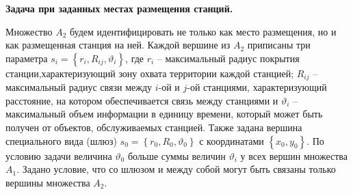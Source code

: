 


\textbf{Задача при заданных местах размещения станций.}






Множество $A_2$ будем идентифицировать не только как место размещения, но и как размещенная станция на ней. Каждой вершине из $A_2$ приписаны три параметра $s_i = \left\{ r_i, R_{ij},\vartheta_i \right\}$, где $r_i$ -- максимальный радиус покрытия станции,характеризующий зону охвата территории каждой станцией; $R_{ij}$ -- максимальный радиус связи между $i$-ой и $j$-ой станциями, характеризующий расстояние, на котором обеспечивается связь между станциями и $\vartheta_i$ -- максимальный объем информации в единицу времени, который может быть получен от объектов, обслуживаемых станцией. Также задана вершина специального вида (шлюз) $s_0 = \left\{ r_0, R_0, \vartheta_0 \right\} $ с координатами $\left\{x_0, y_0 \right\}$. По условию задачи величина $\vartheta_0$ больше суммы величин $\vartheta_i$ у всех вершин множества $A_1$. Задано условие, что со шлюзом и между собой могут быть связаны только вершины множества $A_2$.

